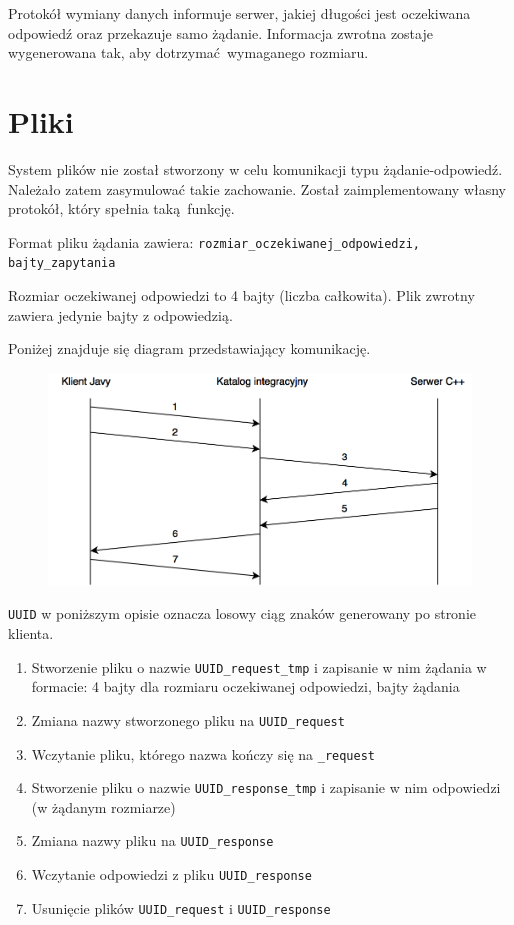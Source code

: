 Protokół wymiany danych informuje serwer, jakiej długości jest oczekiwana odpowiedź oraz przekazuje samo żądanie. Informacja zwrotna zostaje wygenerowana tak, aby dotrzymać wymaganego rozmiaru.


\section{Pliki}

System plików nie został stworzony w celu komunikacji typu żądanie-odpowiedź. Należało zatem zasymulować takie zachowanie. Został zaimplementowany własny protokół, który spełnia taką funkcję.

Format pliku żądania zawiera:
\newline
\texttt{rozmiar\_oczekiwanej\_odpowiedzi, bajty\_zapytania}

Rozmiar oczekiwanej odpowiedzi to 4 bajty (liczba całkowita). Plik zwrotny zawiera jedynie bajty z odpowiedzią.

Poniżej znajduje się diagram przedstawiający komunikację.

\begin{figure}[h!]
    \centering
    \includegraphics[width=\textwidth,height=\textheight,keepaspectratio]{img/files_impl_diagram.png}
    \caption{}
\end{figure}

\texttt{UUID} w poniższym opisie oznacza losowy ciąg znaków generowany po stronie klienta.
\begin{enumerate}
    \item Stworzenie pliku o nazwie \texttt{UUID\_request\_tmp} i zapisanie w nim żądania w formacie: 4 bajty dla rozmiaru oczekiwanej odpowiedzi, bajty żądania
    \item Zmiana nazwy stworzonego pliku na \texttt{UUID\_request}
    \item Wczytanie pliku, którego nazwa kończy się na \texttt{\_request}
    \item Stworzenie pliku o nazwie \texttt{UUID\_response\_tmp} i zapisanie w nim odpowiedzi (w żądanym rozmiarze)
    \item Zmiana nazwy pliku na \texttt{UUID\_response}
    \item Wczytanie odpowiedzi z pliku \texttt{UUID\_response}
    \item Usunięcie plików \texttt{UUID\_request} i \texttt{UUID\_response}
\end{enumerate}

